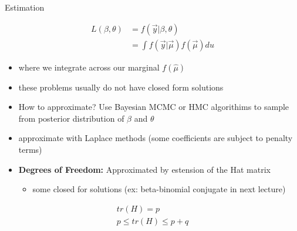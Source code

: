 \documentclass[ignorenonframetext,]{beamer}
\providecommand{\tightlist}{%
  \setlength{\itemsep}{0pt}\setlength{\parskip}{0pt}}
\begin{document}
\begin{frame}{Estimation}

\[
\begin{aligned}
L(\beta,\theta) &=f(\vec y|\beta, \theta)\\
&= \int f(\vec{y} |\vec\mu)f(\vec\mu)du
\end{aligned}
\]

\begin{itemize}
\tightlist
\item
  where we integrate across our marginal \(f(\hat\mu)\)
\item
  these problems usually do not have closed form solutions
\item
  How to approximate? Use Bayesian MCMC or HMC algorithims to sample
  from posterior distribution of \(\beta\) and \(\theta\)
\item
  approximate with Laplace methods (some coefficients are subject to
  penalty terms)
\item
  \textbf{Degrees of Freedom:} Approximated by estension of the Hat
  matrix \small

  \begin{itemize}
  \item some closed for solutions (ex: beta-binomial conjugate in next lecture)
  \end{itemize}
\end{itemize}

\[
\begin{aligned}
tr(H) = p \\
p \leq tr(H) \leq p
+q
\end{aligned}
\]

\end{frame}
\end{document}
